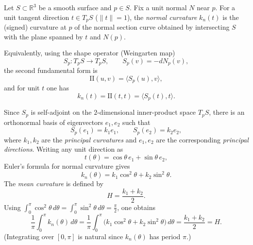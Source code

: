 \documentclass[12pt,a4paper]{article}
\theoremstyle{plain}
\theoremstyle{definition}      %
\begin{document}
Let $S\subset\mathbb R^3$ be a smooth surface and $p\in S$. Fix a unit normal $N$ near $p$.
For a unit tangent direction $t\in T_pS$ ($\|t\|=1$), the \emph{normal curvature} $k_n(t)$
is the (signed) curvature at $p$ of the normal section curve obtained by intersecting $S$
with the plane spanned by $t$ and $N(p)$.

Equivalently, using the shape operator (Weingarten map)
\[
S_p:T_pS\to T_pS,\qquad S_p(v)=-dN_p(v),
\]
the second fundamental form is
\[
\mathrm{II}(u,v)=\langle S_p(u),v\rangle,
\]
and for unit $t$ one has
\[
k_n(t)=\mathrm{II}(t,t)=\langle S_p(t),t\rangle.
\]

Since $S_p$ is self-adjoint on the $2$-dimensional inner-product space $T_pS$, there is an
orthonormal basis of eigenvectors $e_1,e_2$ such that
\[
S_p(e_1)=k_1 e_1,\qquad S_p(e_2)=k_2 e_2,
\]
where $k_1,k_2$ are the \emph{principal curvatures} and $e_1,e_2$ are the corresponding
\emph{principal directions}. Writing any unit direction as
\[
t(\theta)=\cos\theta\,e_1+\sin\theta\,e_2,
\]
Euler's formula for normal curvature gives
\[
k_n(\theta)=k_1\cos^2\theta+k_2\sin^2\theta.
\]
The \emph{mean curvature} is defined by
\[
H=\frac{k_1+k_2}{2}.
\]
Using $\int_0^\pi \cos^2\theta\,d\theta=\int_0^\pi \sin^2\theta\,d\theta=\frac{\pi}{2}$,
one obtains
\[
\frac1\pi\int_0^\pi k_n(\theta)\,d\theta
=\frac1\pi\int_0^\pi\bigl(k_1\cos^2\theta+k_2\sin^2\theta\bigr)\,d\theta
=\frac{k_1+k_2}{2}=H.
\]
(Integrating over $[0,\pi]$ is natural since $k_n(\theta)$ has period $\pi$.)

\end{document}

